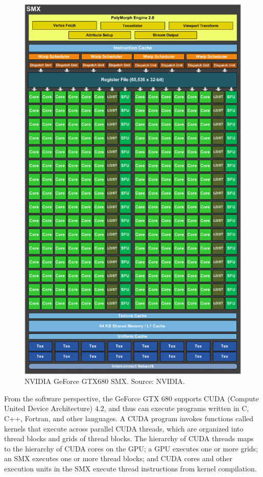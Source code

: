 \begin{figure}
\centering
\includegraphics[width=\textwidth]{GPU/GeForceGTX680SMX.png}
\caption{NVIDIA GeForce GTX680 SMX. Source: NVIDIA.}
\label{GPU:GeForceGTX680SMX}
\end{figure}

From the software perspective, the GeForce GTX 680 supports CUDA (Compute United Device Architecture) 4.2, and thus can execute programs written in C, C++, Fortran, and other languages. A CUDA program invokes functions called kernels that execute across parallel CUDA threads, which are organized into thread blocks and grids of thread blocks. The hierarchy of CUDA threads maps to the hierarchy of CUDA cores on the GPU; a GPU executes one or more grids; an SMX executes one or more thread blocks; and CUDA cores and other execution units in the SMX execute thread instructions from kernel compilation.

